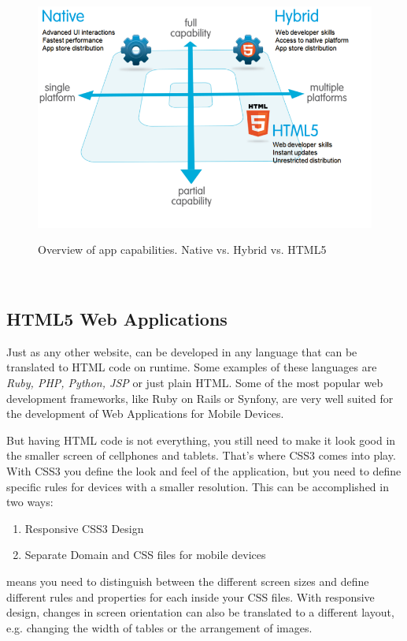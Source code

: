 \begin{figure}[H]
    \begin{center}
        {\includegraphics[width=1\linewidth]{gfx/Native_html5_hybrid}}
        \caption[Overview of app capabilities. Native vs. Hybrid vs. HTML5]{Overview of app capabilities. Native vs. Hybrid vs. HTML5\footnotemark}\label{fig:hybrid_native}
    \end{center}
\end{figure}
\\

\subsection{HTML5 Web Applications}\label{sec:web_app}
Just as any other website,  can be developed in any language that can be translated to HTML code on runtime. Some examples of these languages are \emph{Ruby, PHP, Python, JSP} or just plain HTML. Some of the most popular web development frameworks, like Ruby on Rails or Synfony, are very well suited for the development of Web Applications for Mobile Devices.


But having HTML code is not everything, you still need to make it look good in the smaller screen of cellphones and tablets. That's where CSS3 comes into play. With CSS3 you define the look and feel of the application, but you need to define specific rules for devices with a smaller resolution. This can be accomplished in two ways:
\begin{enumerate}
    \item Responsive CSS3 Design
    \item Separate Domain and CSS files for mobile devices
\end{enumerate}
 means you need to distinguish between the different screen sizes and define different rules and properties for each inside your CSS files. With responsive design, changes in screen orientation can also be translated to a different layout, e.g. changing the width of tables or the arrangement of images.


